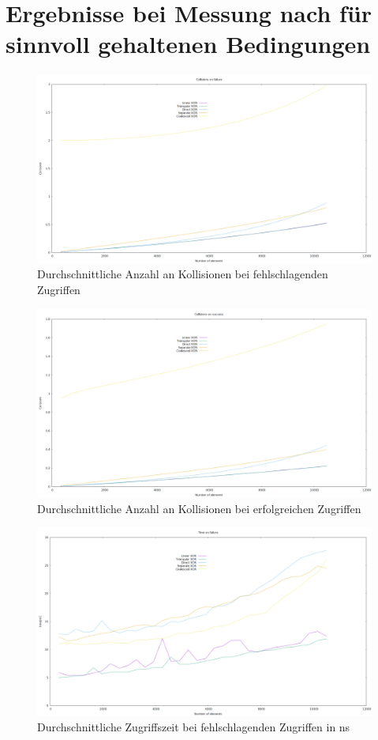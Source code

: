 \section{Ergebnisse bei Messung nach für sinnvoll gehaltenen Bedingungen}
\begin{figure}[!ht]
    \includegraphics[width=0.7\paperwidth]{Bilder/failure_collisions_part.png}
    \caption{Durchschnittliche Anzahl an Kollisionen bei fehlschlagenden Zugriffen}
\end{figure}
\begin{figure}[!ht]
    \includegraphics[width=0.7\paperwidth]{Bilder/successful_collisions_part.png}
    \caption{Durchschnittliche Anzahl an Kollisionen bei erfolgreichen Zugriffen}
\end{figure}
\begin{figure}[!ht]
    \includegraphics[width=0.7\paperwidth]{Bilder/failure_time_part.png}
    \caption{Durchschnittliche Zugriffszeit bei fehlschlagenden Zugriffen in ns}
\end{figure}
